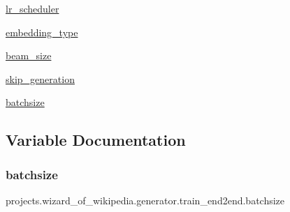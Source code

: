 \begin{DoxyCompactItemize}
\item 
\hyperlink{namespaceprojects_1_1wizard__of__wikipedia_1_1generator_1_1train__end2end_ae100cc5d70b622a5ef7681e87deeb774}{lr\+\_\+scheduler}
\item 
\hyperlink{namespaceprojects_1_1wizard__of__wikipedia_1_1generator_1_1train__end2end_a541edba74b15dc43f7c03219f4602a99}{embedding\+\_\+type}
\item 
\hyperlink{namespaceprojects_1_1wizard__of__wikipedia_1_1generator_1_1train__end2end_a5090eac7597f1f65db30e75276202e55}{beam\+\_\+size}
\item 
\hyperlink{namespaceprojects_1_1wizard__of__wikipedia_1_1generator_1_1train__end2end_a90d2d840bd65cbb3df3197ee614c80f0}{skip\+\_\+generation}
\item 
\hyperlink{namespaceprojects_1_1wizard__of__wikipedia_1_1generator_1_1train__end2end_a48b97dba2d0268456751b3b3874a1367}{batchsize}
\end{DoxyCompactItemize}


\subsection{Variable Documentation}
\mbox{\label{namespaceprojects_1_1wizard__of__wikipedia_1_1generator_1_1train__end2end_a48b97dba2d0268456751b3b3874a1367}} 
\subsubsection{\texorpdfstring{batchsize}{batchsize}}
{\footnotesize\ttfamily projects.\+wizard\+\_\+of\+\_\+wikipedia.\+generator.\+train\+\_\+end2end.\+batchsize}

\mbox{\label{namespaceprojects_1_1wizard__of__wikipedia_1_1generator_1_1train__end2end_a5090eac7597f1f65db30e75276202e55}} 
